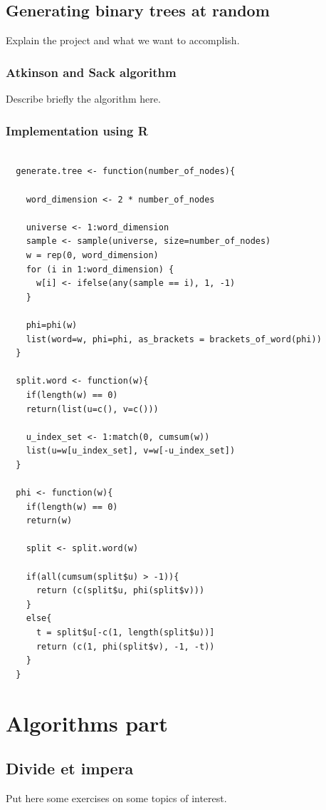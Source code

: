 \documentclass[twoside,openright,titlepage,fleqn,
	headinclude,11pt,a4paper,BCOR5mm,footinclude
	]{scrbook}
\begin{document}
\chapter{Generating binary trees at random}
Explain the project and what we want to accomplish.

\section{Atkinson and Sack algorithm}
Describe briefly the algorithm here.

\section{Implementation using R}

\begin{lstlisting}

  generate.tree <- function(number_of_nodes){

    word_dimension <- 2 * number_of_nodes
    
    universe <- 1:word_dimension
    sample <- sample(universe, size=number_of_nodes)
    w = rep(0, word_dimension)
    for (i in 1:word_dimension) {
      w[i] <- ifelse(any(sample == i), 1, -1)
    }
    
    phi=phi(w)
    list(word=w, phi=phi, as_brackets = brackets_of_word(phi))
  }

  split.word <- function(w){
    if(length(w) == 0)
    return(list(u=c(), v=c()))
    
    u_index_set <- 1:match(0, cumsum(w))
    list(u=w[u_index_set], v=w[-u_index_set])
  }

  phi <- function(w){
    if(length(w) == 0)
    return(w)
    
    split <- split.word(w) 
    
    if(all(cumsum(split$u) > -1)){
      return (c(split$u, phi(split$v)))
    }
    else{
      t = split$u[-c(1, length(split$u))]
      return (c(1, phi(split$v), -1, -t))
    }
  }
\end{lstlisting}

\part{Algorithms part}

\chapter{Divide et impera}
Put here some exercises on some topics of interest.
\end{document}
